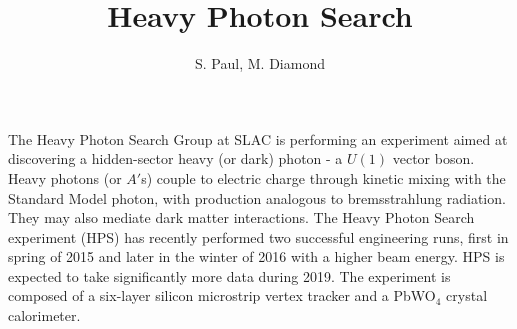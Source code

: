 \documentclass[b1]{sciposter}
\title{Heavy Photon Search}
\author{S. Paul, M. Diamond}
\institute{College of William and Mary, SLAC National Accelerator Laboratory}
\begin{document}
\maketitle

{The Heavy Photon Search Group at SLAC is performing an experiment aimed at discovering a hidden-sector heavy (or dark) photon - a $U(1)$ vector boson. Heavy photons (or $A'$s) couple to electric charge through kinetic mixing with the Standard Model photon, with production analogous to bremsstrahlung radiation. They may also mediate dark matter interactions. The Heavy Photon Search experiment (HPS) has recently performed two successful engineering runs, first in spring of 2015 and later in the winter of 2016 with a higher beam energy. HPS is expected to take significantly more data during 2019. The experiment is composed of a six-layer silicon microstrip vertex tracker and a PbWO$_4$ crystal calorimeter. 
}
\end{document}
